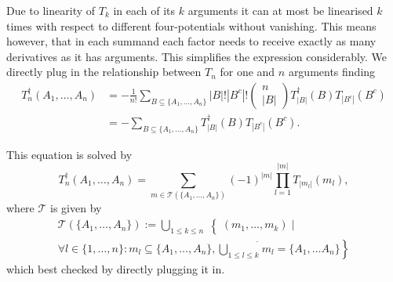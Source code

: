 \documentclass[oneside,reqno,12pt]{amsart}
\begin{document}
Due to linearity of \(T_k\) in each of its \(k\) arguments it can at most be linearised \(k\) times with respect to different four-potentials without vanishing. This means however, that in each summand each factor needs to receive exactly as many derivatives as it has arguments. This simplifies the expression considerably. We directly plug in the relationship between \(T_n\) for one and \(n\) arguments finding
\begin{align*}
T_n^\dagger(A_1,\dots, A_n) 
&= - \frac{1}{n!}  \sum_{B\subseteq \{A_1,\dots, A_n\}} |B|! |B^c|! \begin{pmatrix}n\\|B|\end{pmatrix} T^\dagger_{|B|}(B) T_{|B^c|}(B^c)\\
&= -   \sum_{B\subseteq \{A_1,\dots, A_n\}} T^\dagger_{|B|}(B) T_{|B^c|}(B^c).
\end{align*}

This equation is solved by
\begin{equation}
T_n^\dagger(A_1,\dots, A_n) = \sum_{m\in \mathcal{T}(\{A_1,\dots, A_n\})} (-1)^{|m|} \prod_{l=1}^{|m|} T_{|m_l|} (m_l),
\end{equation}
where \(\mathcal{T}\) is given by
\begin{align*}
\mathcal{T}(\{A_1,\dots, A_n\}):= \left.\bigcup_{1\le k \le n} \right\{ (m_1, \dots, m_k) \mid \\
\left.  \forall l\in \{1,\dots, n\}: m_l \subseteq \{A_1,\dots, A_n\}, \dot{\bigcup_{1\le l \le k}}m_l= \{A_1,\dots A_n\} \right\}
\end{align*}
which best checked by directly plugging it in.
\end{document}
